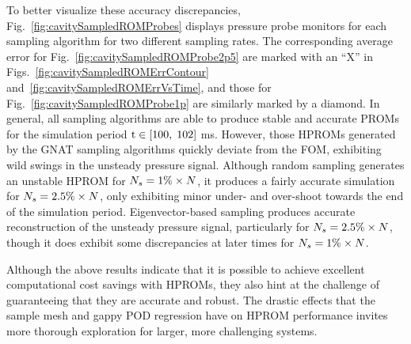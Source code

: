 To better visualize these accuracy discrepancies, Fig.~\ref{fig:cavitySampledROMProbes} displays pressure probe monitors for each sampling algorithm for two different sampling rates. The corresponding average error for Fig.~\ref{fig:cavitySampledROMProbe2p5} are marked with an ``X'' in Figs.~\ref{fig:cavitySampledROMErrContour} and~\ref{fig:cavitySampledROMErrVsTime}, and those for Fig.~\ref{fig:cavitySampledROMProbe1p} are similarly marked by a diamond. In general, all sampling algorithms are able to produce stable and accurate PROMs for the simulation period $\text{t} \in [100, \; 102]$ ms. However, those HPROMs generated by the GNAT sampling algorithms quickly deviate from the FOM, exhibiting wild swings in the unsteady pressure signal. Although random sampling generates an unstable HPROM for $N_s = 1\% \times N$, it produces a fairly accurate simulation for $N_s = 2.5\% \times N$, only exhibiting minor under- and over-shoot towards the end of the simulation period. Eigenvector-based sampling produces accurate reconstruction of the unsteady pressure signal, particularly for $N_s = 2.5\% \times N$, though it does exhibit some discrepancies at later times for $N_s = 1\% \times N$.

Although the above results indicate that it is possible to achieve excellent computational cost savings with HPROMs, they also hint at the challenge of guaranteeing that they are accurate and robust. The drastic effects that the sample mesh and gappy POD regression have on HPROM performance invites more thorough exploration for larger, more challenging systems.